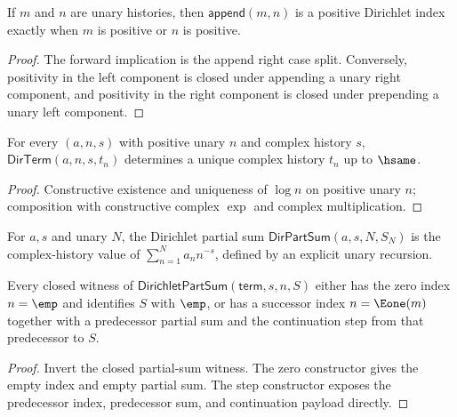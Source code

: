 \begin{theorem}
\label{thm:dirichlet-positive-index-append-iff}
If $m$ and $n$ are unary histories, then $\mathsf{append}(m,n)$ is a positive
Dirichlet index exactly when $m$ is positive or $n$ is positive.
\end{theorem}
\begin{proof}
The forward implication is the append right case split. Conversely, positivity
in the left component is closed under appending a unary right component, and
positivity in the right component is closed under prepending a unary left
component.
\end{proof}

\begin{lemma}
\label{lem:dir-term-well-defined}
For every \((a, n, s)\) with positive unary \(n\) and complex history \(s\), \(\mathsf{DirTerm}(a, n, s, t_n)\) determines a unique complex history \(t_n\) up to \(\hsame\).
\end{lemma}
\begin{proof}
Constructive existence and uniqueness of \(\log n\) on positive unary \(n\); composition with constructive complex \(\exp\) and complex multiplication.
\end{proof}

\begin{definition}
\label{def:dir-part-sum}
For \(a, s\) and unary \(N\), the Dirichlet partial sum \(\mathsf{DirPartSum}(a, s, N, S_N)\) is the complex-history value of \(\sum_{n=1}^{N} a_n n^{-s}\), defined by an explicit unary recursion.
\end{definition}

\begin{lemma}
\label{lem:dirichlet-part-sum-index-cases}
Every closed witness of $\mathsf{DirichletPartSum}(\mathsf{term},s,n,S)$
either has the zero index $n=\emp$ and identifies $S$ with $\emp$, or has a
successor index $n=\Eone(m)$ together with a predecessor partial sum and the
continuation step from that predecessor to $S$.
\end{lemma}
\begin{proof}
Invert the closed partial-sum witness. The zero constructor gives the empty
index and empty partial sum. The step constructor exposes the predecessor
index, predecessor sum, and continuation payload directly.
\end{proof}

